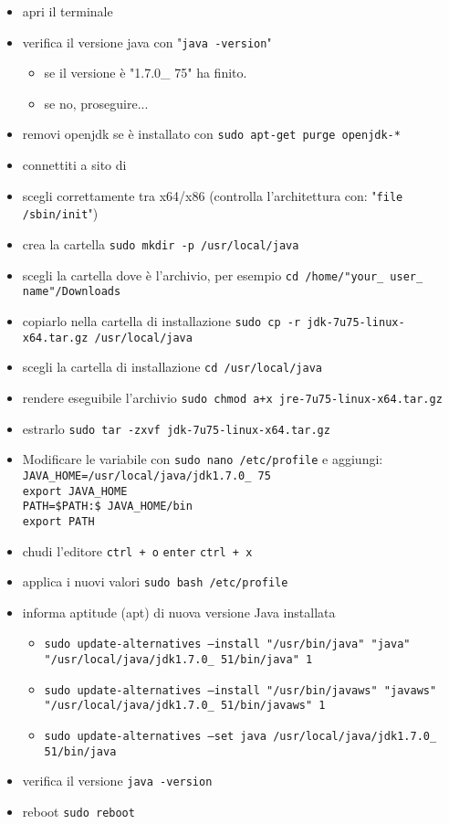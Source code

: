 \documentclass{article}
\begin{document}
\begin{itemize}
\item apri il terminale
\item  verifica il versione java con "\texttt{java -version}"
\begin{itemize}
\item se il versione \`e "1.7.0\_ 75" ha finito.
\item se no, proseguire...
\end{itemize}
\item removi openjdk se \`e installato con \texttt{sudo apt-get purge openjdk-*}
\item connettiti a sito di
  \href{http://www.oracle.com/technetwork/java/javase/downloads/jdk7-downloads-1880260.html}{}
\item scegli correttamente tra x64/x86 (controlla l'architettura con:  "\texttt{file /sbin/init}")
\item crea la cartella \texttt{sudo mkdir -p /usr/local/java}
\item scegli la cartella dove \`e l'archivio, per esempio \texttt{cd /home/"your\_ user\_ name"/Downloads}
\item copiarlo nella cartella di installazione	\texttt{sudo cp -r jdk-7u75-linux-x64.tar.gz /usr/local/java}
\item scegli la cartella di installazione \texttt{cd /usr/local/java}
\item rendere eseguibile l'archivio \texttt{sudo chmod a+x jre-7u75-linux-x64.tar.gz}
\item estrarlo \texttt{sudo tar -zxvf jdk-7u75-linux-x64.tar.gz}
\item Modificare le variabile con \texttt{sudo nano /etc/profile}  e
  aggiungi: \\
\texttt{JAVA\_HOME=/usr/local/java/jdk1.7.0\_ 75} \\
\texttt{export JAVA\_HOME}\\
\texttt{PATH=\$PATH:\$ JAVA\_HOME/bin}\\
\texttt{export PATH}
\item chudi l'editore \texttt{ctrl + o} \texttt{enter} \texttt{ctrl + x}
\item applica i nuovi valori \texttt{sudo bash /etc/profile}
\item informa aptitude (apt) di nuova versione Java installata
\begin{itemize}
\item \texttt{sudo update-alternatives --install "/usr/bin/java" "java" "/usr/local/java/jdk1.7.0\_ 51/bin/java" 1}
\item \texttt{sudo update-alternatives --install "/usr/bin/javaws" "javaws" "/usr/local/java/jdk1.7.0\_ 51/bin/javaws" 1}
\item \texttt{sudo update-alternatives --set java /usr/local/java/jdk1.7.0\_ 51/bin/java}
\end{itemize} 
\item verifica il versione \texttt{java -version}
\item reboot \texttt{sudo reboot}
\end{itemize}
\end{document}
